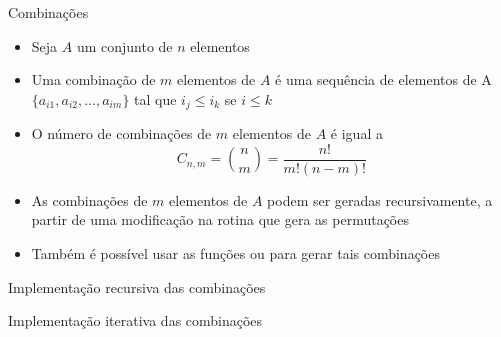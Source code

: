 \begin{frame}[fragile]{Combinações}

    \begin{itemize}
        \item Seja $A$ um conjunto de $n$ elementos

        \item Uma combinação de $m$ elementos de $A$ é uma sequência de elementos de
            A $\lbrace a_{i1}, a_{i2}, \ldots, a_{im}\rbrace$ tal que $i_j \leq i_k$ se $i\leq k$

        \item O número de combinações de $m$ elementos de $A$ é igual a 
        \[
            C_{n,m} = \binom{n}{m} = \frac{n!}{m!(n - m)!}
        \]

        \item As combinações de $m$ elementos de $A$ podem ser geradas recursivamente, a
            partir de uma modificação na rotina que gera as permutações

        \item Também é possível usar as funções  ou
             para gerar tais combinações
            
    \end{itemize}

\end{frame}

\begin{frame}[fragile]{Implementação recursiva das combinações}
\end{frame}

\begin{frame}[fragile]{Implementação iterativa das combinações}
\end{frame}


